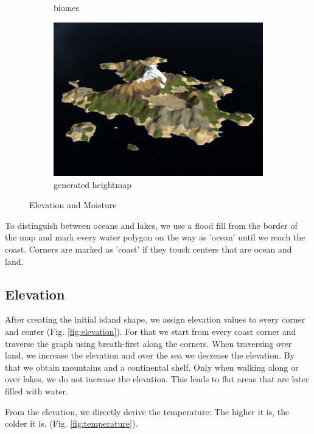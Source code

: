 \documentclass[journal, letterpaper]{IEEEtran}
\begin{document}
\begin{figure}
\begin{subfigure}[b]{0.3\textwidth}
		\caption{biomes}
		\label{fig:biomes}
	\end{subfigure}
	\begin{subfigure}[b]{0.3\textwidth}
		\includegraphics[width=\textwidth]{images/heightmap}
		\caption{generated heightmap}
		\label{fig:heightmap}
	\end{subfigure}
	\caption{Elevation and Moisture}\label{fig:PolygonalMap2}
\end{figure}

To distinguish between oceans and lakes, we use a flood fill from the border of the map and mark every water polygon on the way as 'ocean' until we reach the coast.
Corners are marked as 'coast' if they touch centers that are ocean and land.

\subsection{Elevation}\label{Elevation}
After creating the initial island shape, we assign elevation values to every corner and center (Fig. \ref{fig:elevation}).
For that we start from every coast corner and traverse the graph using breath-first along the corners. When traversing over land, we increase the elevation and over the sea we decrease the elevation. By that we obtain mountains and a continental shelf. Only when walking along or over lakes, we do not increase the elevation. This leads to flat areas that are later filled with water.

From the elevation, we directly derive the temperature: The higher it is, the colder it is. (Fig. \ref{fig:temperature}).
\end{document}
